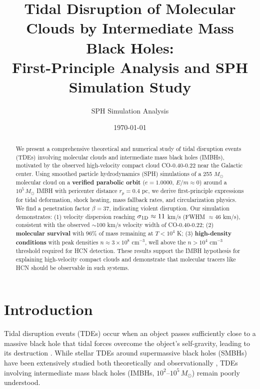 \documentclass[twocolumn,amsmath,amssymb,prd,superscriptaddress,nofootinbib]{revtex4-2}
\begin{document}
\title{Tidal Disruption of Molecular Clouds by Intermediate Mass Black Holes:\\
First-Principle Analysis and SPH Simulation Study}

\author{SPH Simulation Analysis}

\date{\today}

\begin{abstract}
We present a comprehensive theoretical and numerical study of tidal disruption events (TDEs) involving molecular clouds and intermediate mass black holes (IMBHs), motivated by the observed high-velocity compact cloud CO-0.40-0.22 near the Galactic center. Using smoothed particle hydrodynamics (SPH) simulations of a 255 $M_\odot$ molecular cloud on a \textbf{verified parabolic orbit} ($e = 1.0000$, $E/m \approx 0$) around a $10^5\,M_\odot$ IMBH with pericenter distance $r_p = 0.4$ pc, we derive first-principle expressions for tidal deformation, shock heating, mass fallback rates, and circularization physics. We find a penetration factor $\beta = 37$, indicating violent disruption. Our simulation demonstrates: (1) velocity dispersion reaching $\sigma_{\rm 1D} \approx 11$ km/s (FWHM $\approx 46$ km/s), consistent with the observed $\sim$100 km/s velocity width of CO-0.40-0.22; (2) \textbf{molecular survival} with 96\% of mass remaining at $T < 10^4$ K; (3) \textbf{high-density conditions} with peak densities $n \approx 3 \times 10^8$ cm$^{-3}$, well above the $n > 10^4$ cm$^{-3}$ threshold required for HCN detection. These results support the IMBH hypothesis for explaining high-velocity compact clouds and demonstrate that molecular tracers like HCN should be observable in such systems.
\end{abstract}

\maketitle

\section{Introduction}
\label{sec:intro}

Tidal disruption events (TDEs) occur when an object passes sufficiently close to a massive black hole that tidal forces overcome the object's self-gravity, leading to its destruction \cite{Rees1988,Hills1975}. While stellar TDEs around supermassive black holes (SMBHs) have been extensively studied both theoretically and observationally \cite{Gezari2021}, TDEs involving intermediate mass black holes (IMBHs, $10^2$--$10^5\,M_\odot$) remain poorly understood.
\end{document}
